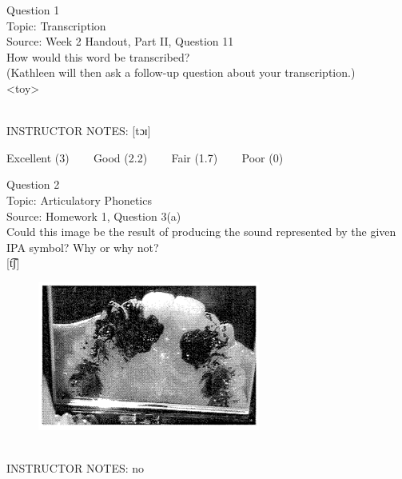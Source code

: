 \documentclass[12pt]{article}
\begin{document}
\begin{center}
\textbf{{\color{blue}{\HUGE START OF EXAM\\}}}

\textbf{{\color{blue}{\HUGE Student ID: 48772\\}}}

\textbf{{\color{blue}{\HUGE \\}}}

\end{center}
\newpage

{\large Question 1}\\

Topic: Transcription\\
Source: Week 2 Handout, Part II, Question 11\\

How would this word be transcribed?\\ (Kathleen will then ask a follow-up question about your transcription.)\\

<toy>


~\\
INSTRUCTOR NOTES: [tɔɪ]


\vfill
Excellent (3) ~~~ Good (2.2) ~~~ Fair (1.7) ~~~ Poor (0)
\newpage

{\large Question 2}\\

Topic: Articulatory Phonetics\\
Source: Homework 1, Question 3(a)\\

Could this image be the result of producing the sound represented by the given IPA symbol? Why or why not?\\

{[t͡ʃ]}

\begin{figure}[H]
\includegraphics{../images/staticpalatography_fricative.png}
\end{figure}

~\\
INSTRUCTOR NOTES: no
\end{document}
